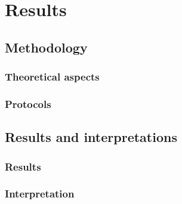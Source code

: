
\chapter{Results} %

\label{Results} %



\section{Methodology}

\subsection{Theoretical aspects}
\subsection{Protocols}



\section{Results and interpretations}

\subsection{Results}
\subsection{Interpretation}